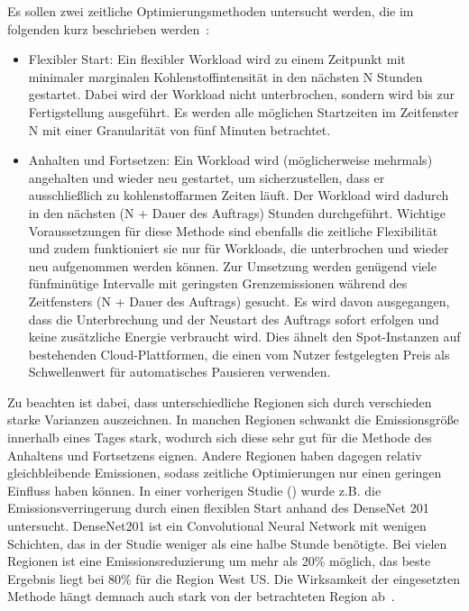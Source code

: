 Es sollen zwei zeitliche Optimierungsmethoden untersucht werden, die im folgenden kurz beschrieben werden~\cite{Dodge.06212022}:
\begin{itemize}
 \item Flexibler Start: Ein flexibler Workload wird zu einem Zeitpunkt mit minimaler marginalen Kohlenstoffintensität in den nächsten N Stunden gestartet.
 Dabei wird der Workload nicht unterbrochen, sondern wird bis zur Fertigstellung ausgeführt.
 Es werden alle möglichen Startzeiten im Zeitfenster N mit einer Granularität von fünf Minuten betrachtet.
 \item Anhalten und Fortsetzen: Ein Workload wird (möglicherweise mehrmals) angehalten und wieder neu gestartet, um sicherzustellen, dass er ausschließlich zu kohlenstoffarmen Zeiten läuft.
 Der Workload wird dadurch in den nächsten (N + Dauer des Auftrags) Stunden durchgeführt.
 Wichtige Voraussetzungen für diese Methode sind ebenfalls die zeitliche Flexibilität und zudem funktioniert sie nur für Workloads, die unterbrochen und wieder neu aufgenommen werden können.
 Zur Umsetzung werden genügend viele fünfminütige Intervalle mit geringsten Grenzemissionen während des Zeitfensters (N + Dauer des Auftrags) gesucht.
 Es wird davon ausgegangen, dass die Unterbrechung und der Neustart des Auftrags sofort erfolgen und keine zusätzliche Energie verbraucht wird.
 Dies ähnelt den Spot-Instanzen auf bestehenden Cloud-Plattformen, die einen vom Nutzer festgelegten Preis als Schwellenwert für automatisches Pausieren verwenden.
\end {itemize}
Zu beachten ist dabei, dass unterschiedliche Regionen sich durch verschieden starke Varianzen auszeichnen.
In manchen Regionen schwankt die Emissionsgröße innerhalb eines Tages stark, wodurch sich diese sehr gut für die Methode des Anhaltens und Fortsetzens eignen.
Andere Regionen haben dagegen relativ gleichbleibende Emissionen, sodass zeitliche Optimierungen nur einen geringen Einfluss haben können.
In einer vorherigen Studie (\cite{Dodge.06212022}) wurde z.B. die Emissionsverringerung durch einen flexiblen Start anhand des DenseNet 201 untersucht.
DenseNet201 ist ein Convolutional Neural Network mit wenigen Schichten, das in der Studie weniger als eine halbe Stunde benötigte.
Bei vielen Regionen ist eine Emissionsreduzierung um mehr als 20\% möglich, das beste Ergebnis liegt bei 80\% für die Region West US\@.
Die Wirksamkeit der eingesetzten Methode hängt demnach auch stark von der betrachteten Region ab~\cite{Dodge.06212022}.

